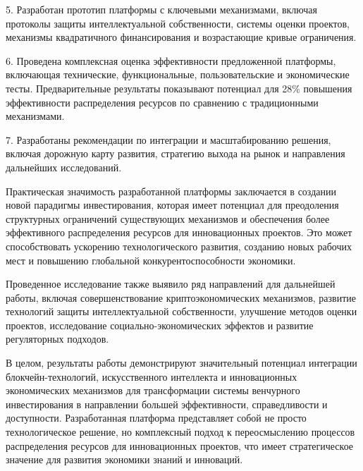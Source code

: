 \documentclass[
    14pt,
    specialist,
    candidate, %
    subf, %
    href,
    dotsinheaders=false
]{disser}
\begin{document}
5. Разработан прототип платформы с ключевыми механизмами, включая протоколы защиты интеллектуальной собственности, системы оценки проектов, механизмы квадратичного финансирования и возрастающие кривые ограничения.

6. Проведена комплексная оценка эффективности предложенной платформы, включающая технические, функциональные, пользовательские и экономические тесты. Предварительные результаты показывают потенциал для 28\% повышения эффективности распределения ресурсов по сравнению с традиционными механизмами.

7. Разработаны рекомендации по интеграции и масштабированию решения, включая дорожную карту развития, стратегию выхода на рынок и направления дальнейших исследований.

Практическая значимость разработанной платформы заключается в создании новой парадигмы инвестирования, которая имеет потенциал для преодоления структурных ограничений существующих механизмов и обеспечения более эффективного распределения ресурсов для инновационных проектов. Это может способствовать ускорению технологического развития, созданию новых рабочих мест и повышению глобальной конкурентоспособности экономики.

Проведенное исследование также выявило ряд направлений для дальнейшей работы, включая совершенствование криптоэкономических механизмов, развитие технологий защиты интеллектуальной собственности, улучшение методов оценки проектов, исследование социально-экономических эффектов и развитие регуляторных подходов.

В целом, результаты работы демонстрируют значительный потенциал интеграции блокчейн-технологий, искусственного интеллекта и инновационных экономических механизмов для трансформации системы венчурного инвестирования в направлении большей эффективности, справедливости и доступности. Разработанная платформа представляет собой не просто технологическое решение, но комплексный подход к переосмыслению процессов распределения ресурсов для инновационных проектов, что имеет стратегическое значение для развития экономики знаний и инноваций.

\renewcommand{\bibname}{\fontsize{14pt}{21pt}\selectfont СПИСОК ИСПОЛЬЗОВАННЫХ ИСТОЧНИКОВ}


\end{document}
